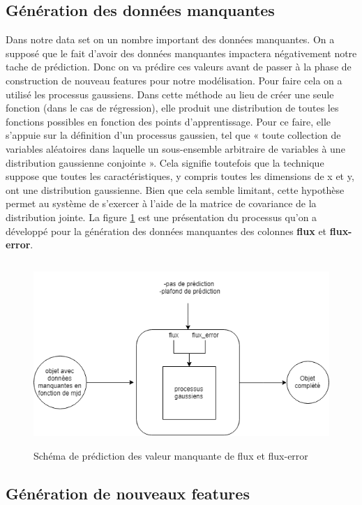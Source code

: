 \subsection{Génération des données manquantes}
 Dans notre data set on un nombre important des données manquantes. On a supposé que le fait d’avoir des données manquantes impactera négativement notre tache de prédiction. Donc on va prédire ces valeurs avant de passer à la phase de construction de nouveau features pour notre modélisation. Pour faire cela on a utilisé les processus gaussiens. Dans cette méthode au lieu de créer une seule fonction  (dans le cas de régression), elle produit une distribution de toutes les fonctions possibles en fonction des points d'apprentissage. Pour ce faire, elle s’appuie sur la définition d’un processus gaussien, tel que « toute collection de variables aléatoires dans laquelle un sous-ensemble arbitraire de variables à une distribution gaussienne conjointe ». Cela signifie toutefois que la technique suppose que toutes les caractéristiques, y compris toutes les dimensions de x et y, ont une distribution gaussienne. Bien que cela semble limitant, cette hypothèse permet au système de s'exercer à l'aide de la matrice de covariance de la distribution jointe.
La figure \ref{fig:blackbox_shema} est une présentation du processus qu'on a développé pour la génération des données manquantes  des colonnes \textbf{flux} et \textbf{flux-error}.
\begin{figure}[!h]
    \centering
    \includegraphics[width=12cm,height=7cm]{report/figures/blackbox.png}
    \caption{Schéma de prédiction des valeur manquante de flux et flux-error}
    \label{fig:blackbox_shema}
\end{figure}
\subsection{Génération de nouveaux features}



